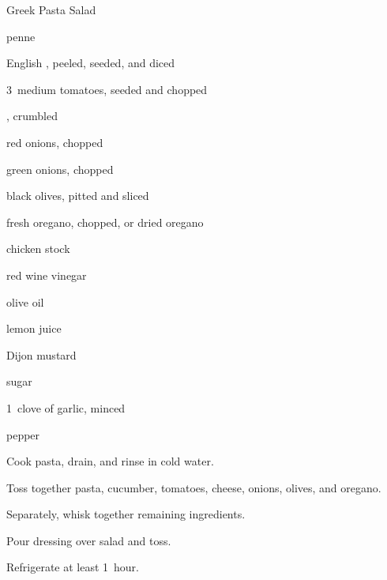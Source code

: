 \begin{recipe}{Greek Pasta Salad}{}{}

\begin{ingredients}
\item {} penne
\item \C{1\half} English , peeled, seeded, and diced
\item 3~medium tomatoes, seeded and chopped
\item {} , crumbled
\item \C{\half} red onions, chopped
\item \C{\quarter} green onions, chopped
\item \C{\quarter} black olives, pitted and sliced
\item \C{\quarter} fresh oregano, chopped, or  dried oregano
\item \C{\half} chicken stock
\item \C{\quarter} red wine vinegar
\item {} olive oil
\item {} lemon juice
\item {} Dijon mustard
\item {} sugar
\item 1~clove of garlic, minced
\item \tp{\quarter} pepper
\end{ingredients}

\begin{directions}
\item Cook pasta, drain, and rinse in cold water.
\item Toss together pasta, cucumber, tomatoes, cheese, onions, olives, and oregano.
\item Separately, whisk together remaining ingredients.
\item Pour dressing over salad and toss.
\item Refrigerate at least 1~hour.
\end{directions}

\end{recipe}
